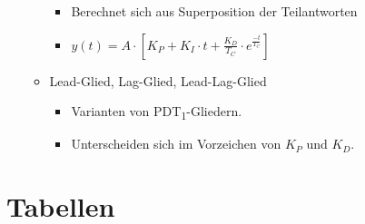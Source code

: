 \documentclass[margin=normal]{tex/hsrzf}
\begin{document}
\begin{itemize}
\begin{itemize}
\begin{itemize}
\begin{itemize}
                                    \end{itemize}
                              \item Berechnet sich aus Superposition der Teilantworten
                              \item $y(t) = A \cdot [K_P + K_I \cdot t + \frac{K_D}{T_C} \cdot e^{\frac{-t}{T_C}}]$
                        \end{itemize}
                  \item Lead-Glied, Lag-Glied, Lead-Lag-Glied
                        \begin{itemize}
                              \item Varianten von PDT\textsubscript{1}-Gliedern.
                              \item Unterscheiden sich im Vorzeichen von $K_P$ und $K_D$.
                        \end{itemize}

            \end{itemize}
\end{itemize}




\section{Tabellen}
\end{document}

